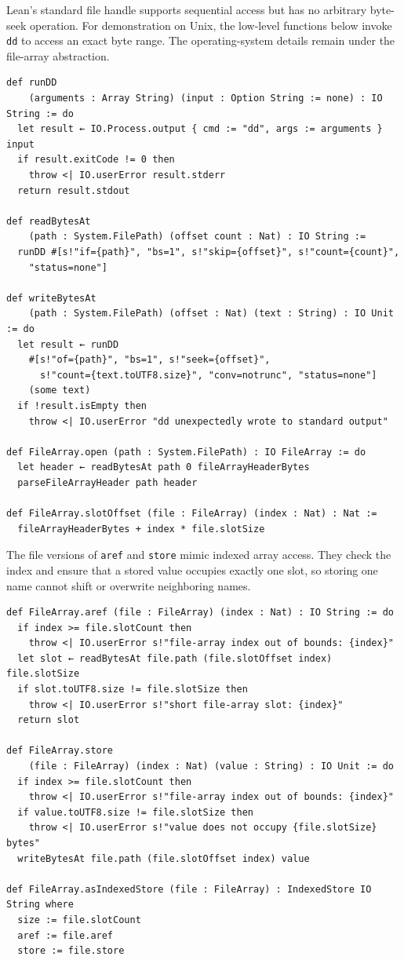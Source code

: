 \documentclass[11pt]{article}
\begin{document}
Lean's standard file handle supports sequential access but has no arbitrary
byte-seek operation.  For demonstration on Unix, the low-level functions below
invoke \texttt{dd} to access an exact byte range.  The operating-system details remain
under the file-array abstraction.

\begin{verbatim}
def runDD
    (arguments : Array String) (input : Option String := none) : IO String := do
  let result ← IO.Process.output { cmd := "dd", args := arguments } input
  if result.exitCode != 0 then
    throw <| IO.userError result.stderr
  return result.stdout

def readBytesAt
    (path : System.FilePath) (offset count : Nat) : IO String :=
  runDD #[s!"if={path}", "bs=1", s!"skip={offset}", s!"count={count}",
    "status=none"]

def writeBytesAt
    (path : System.FilePath) (offset : Nat) (text : String) : IO Unit := do
  let result ← runDD
    #[s!"of={path}", "bs=1", s!"seek={offset}",
      s!"count={text.toUTF8.size}", "conv=notrunc", "status=none"]
    (some text)
  if !result.isEmpty then
    throw <| IO.userError "dd unexpectedly wrote to standard output"

def FileArray.open (path : System.FilePath) : IO FileArray := do
  let header ← readBytesAt path 0 fileArrayHeaderBytes
  parseFileArrayHeader path header

def FileArray.slotOffset (file : FileArray) (index : Nat) : Nat :=
  fileArrayHeaderBytes + index * file.slotSize
\end{verbatim}

The file versions of \texttt{aref} and \texttt{store} mimic indexed array access.  They check
the index and ensure that a stored value occupies exactly one slot, so storing
one name cannot shift or overwrite neighboring names.

\begin{verbatim}
def FileArray.aref (file : FileArray) (index : Nat) : IO String := do
  if index >= file.slotCount then
    throw <| IO.userError s!"file-array index out of bounds: {index}"
  let slot ← readBytesAt file.path (file.slotOffset index) file.slotSize
  if slot.toUTF8.size != file.slotSize then
    throw <| IO.userError s!"short file-array slot: {index}"
  return slot

def FileArray.store
    (file : FileArray) (index : Nat) (value : String) : IO Unit := do
  if index >= file.slotCount then
    throw <| IO.userError s!"file-array index out of bounds: {index}"
  if value.toUTF8.size != file.slotSize then
    throw <| IO.userError s!"value does not occupy {file.slotSize} bytes"
  writeBytesAt file.path (file.slotOffset index) value

def FileArray.asIndexedStore (file : FileArray) : IndexedStore IO String where
  size := file.slotCount
  aref := file.aref
  store := file.store
\end{verbatim}
\end{document}
